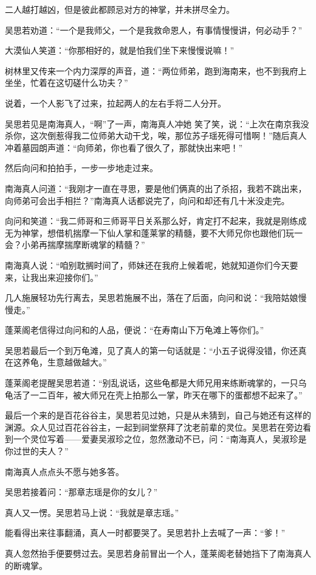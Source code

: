 二人越打越凶，但是彼此都顾忌对方的神掌，并未拼尽全力。

吴思若劝道：“一个是我师父，一个是我救命恩人，有事情慢慢讲，何必动手？”

大漠仙人笑道：“你那相好的，就是怕我们坐下来慢慢说嘛！”

树林里又传来一个内力深厚的声音，道：“两位师弟，跑到海南来，也不到我府上坐坐，忙着在这切磋什么功夫？”

说着，一个人影飞了过来，拉起两人的左右手将二人分开。

吴思若见是南海真人，“啊”了一声，南海真人冲她
笑了笑，说：“上次在南京我没杀你，这次倒惹得我二位师弟大动干戈，唉，那位苏子瑶死得可惜啊！”随后真人冲着墓园朗声道：“向师弟，你也看了很久了，那就快出来吧！”

然后向问和拍拍手，一步一步地走过来。

南海真人问道：“我刚才一直在寻思，要是他们俩真的出了杀招，我若不跳出来，向师弟可会出手相拦？”南海真人话都说完了，向问和却还有几十米没走完。

向问和笑道：“我二师哥和三师哥平日关系那么好，肯定打不起来，我就是刚练成无为神掌，想借机揣摩一下仙人掌和蓬莱掌的精髓，要不大师兄你也跟他们玩一会？小弟再揣摩揣摩断魂掌的精髓？”

南海真人说：“咱别耽搁时间了，师妹还在我府上候着呢，她就知道你们今天要来，让我出来迎接你们。”

几人施展轻功先行离去，吴思若施展不出，落在了后面，向问和说：“我陪姑娘慢慢走。”

蓬莱阁老信得过向问和的人品，便说：“在寿南山下万龟滩上等你们。”

吴思若最后一个到万龟滩，见了真人的第一句话就是：“小五子说得没错，你还真在这养龟，生意越做越大。”

蓬莱阁老提醒吴思若道：“别乱说话，这些龟都是大师兄用来练断魂掌的，一只乌龟活了一二百年，被大师兄在壳上拍那么一掌，昨天在哪下的蛋都想不起来了。”
\newline

最后一个来的是百花谷谷主，吴思若见过她，只是从未猜到，自己与她还有这样的渊源。众人见过百花谷谷主，一起到祠堂祭拜了沈老前辈的灵位。吴思若在旁边看到一个灵位写着——爱妻吴淑珍之位，忽然激动不已，问：“南海真人，吴淑珍是你过世的夫人？”

南海真人点点头不愿与她多答。

吴思若接着问：“那章志瑶是你的女儿？”

真人又一愣。吴思若马上说：“我就是章志瑶。”

能看得出来往事翻涌，真人一时都要哭了。吴思若扑上去喊了一声：“爹！”

真人忽然抬手便要劈过去。吴思若身前冒出一个人，蓬莱阁老替她挡下了南海真人的断魂掌。

